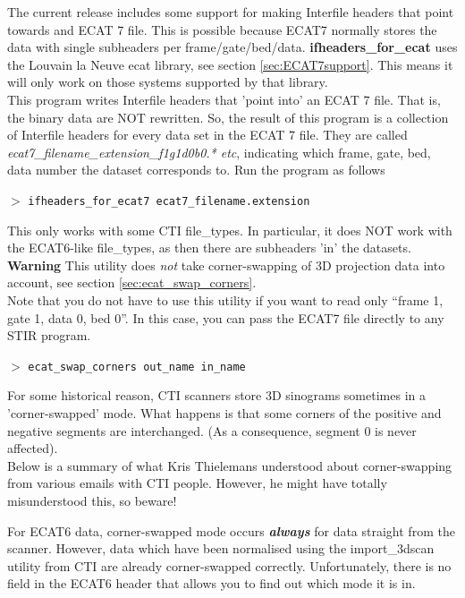 \documentclass{article}
\newcommand{\cmdline}[1]{\par \noindent $>$ \texttt{#1}\par}
\begin{document}
{ 
}

The current release includes some support for making Interfile 
headers that point towards and ECAT 7 file. This is possible 
because ECAT7 normally stores the data with single subheaders 
per frame/gate/bed/data. \textbf{ifheaders\_for\_ecat} uses the Louvain 
la Neuve ecat library, see section \ref{sec:ECAT7support}. 
This means it will only work on those systems 
supported by that library. \\
This program writes Interfile headers that 'point into' an ECAT 
7 file. That is, the binary data are NOT rewritten. So, the result 
of this program is a collection of Interfile headers for every 
data set in the ECAT 7 file. They are called \textit{ecat7\_filename\_extension\_f1g1d0b0.* 
etc}, indicating which frame, gate, bed, data number the dataset 
corresponds to. Run the program as follows
\cmdline{ifheaders\_for\_ecat7 ecat7\_filename.extension}


This only works with some CTI file\_types. In particular, it 
does NOT work with the ECAT6-like file\_types, as then there 
are subheaders 'in' the datasets.\\
\textbf{Warning} This utility does \textit{not} take corner-swapping of 
3D projection data into account, see section \ref{sec:ecat_swap_corners}.\\
Note that you do not have to use this utility if you want to 
read only ``frame 1, gate 1, data 0, bed 0''. In this case, you 
can pass the ECAT7 file directly to any STIR program.

{ 
}
\label{sec:ecat_swap_corners}

{ 
}
\cmdline{ecat\_swap\_corners out\_name in\_name}

{ 
}

For some historical reason, CTI scanners store 3D sinograms sometimes 
in a 'corner-swapped' mode. What happens is that some corners 
of the positive and negative segments are interchanged. (As a 
consequence, segment 0 is never affected).\\
Below is a summary of what Kris Thielemans understood about corner-swapping 
from various emails with CTI people. However, he might have totally 
misunderstood this, so beware!



For ECAT6 data, corner-swapped mode occurs \textbf{\textit{always}} for 
data straight from the scanner. However, data which have been 
normalised using the import\_3dscan utility from CTI are already 
corner-swapped correctly. Unfortunately, there is no field in 
the ECAT6 header that allows you to find out which mode it is 
in.
\end{document}
